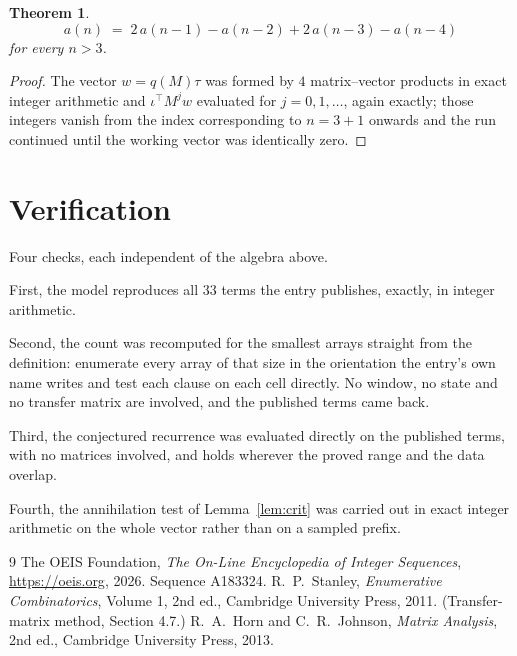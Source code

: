 \documentclass[11pt,a4paper]{article}
\theoremstyle{plain}
\newtheorem{theorem}{Theorem}
\theoremstyle{definition}
\begin{document}
\begin{theorem}
\[
a(n)\;=\;2\,a(n-1) - a(n-2) + 2\,a(n-3) - a(n-4)
\]
for every $n>3$.
\end{theorem}

\begin{proof}
The vector $w=q(M)\tau$ was formed by $4$ matrix--vector products in exact integer
arithmetic and $\iota^{\!\top}M^{j}w$ evaluated for $j=0,1,\dots$, again exactly; those
integers vanish from the index corresponding to $n=3+1$ onwards and the run continued
until the working vector was identically zero.
\end{proof}

\section{Verification}

Four checks, each independent of the algebra above.

First, the model reproduces all $33$ terms the entry publishes, exactly, in integer
arithmetic.

Second, the count was recomputed for the smallest arrays straight from the definition:
enumerate every array of that size in the orientation the entry's own name writes and test each
clause on each cell directly. No window, no state and no transfer matrix are involved, and the
published terms came back.

Third, the conjectured recurrence was evaluated directly on the published terms, with no
matrices involved, and holds wherever the proved range and the data overlap.

Fourth, the annihilation test of Lemma~\ref{lem:crit} was carried out in exact integer
arithmetic on the whole vector rather than on a sampled prefix.

\begin{thebibliography}{9}
 The OEIS Foundation, \emph{The On-Line Encyclopedia of Integer
Sequences}, \url{https://oeis.org}, 2026. Sequence A183324.
 R.~P.~Stanley, \emph{Enumerative Combinatorics}, Volume 1, 2nd ed.,
Cambridge University Press, 2011. (Transfer-matrix method, Section 4.7.)
 R.~A.~Horn and C.~R.~Johnson, \emph{Matrix Analysis}, 2nd ed., Cambridge
University Press, 2013.
\end{thebibliography}
\end{document}
